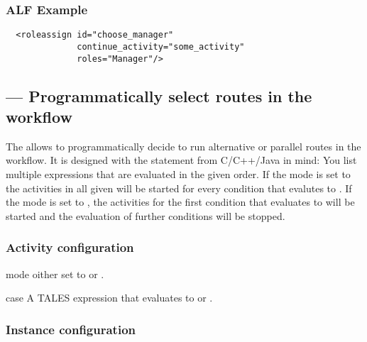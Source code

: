 \subsubsection{ALF Example}

\begin{verbatim}
  <roleassign id="choose_manager"
              continue_activity="some_activity"
              roles="Manager"/>
\end{verbatim}

\subsection{ --- Programmatically select routes in the workflow}

 
The  allows to programmatically decide to run alternative or
parallel routes in the workflow.  It is designed with the 
statement from C/C++/Java in mind: You list multiple expressions that are
evaluated in the given order. If the mode is set to  the activities in
all given will be started for every condition that evalutes to .  If
the mode is set to , the activities for the first condition that
evaluates to  will be started and the evaluation of further
conditions will be stopped.
 
\subsubsection{Activity configuration}

\begin{memberdesc}{mode}
    oither set to  or . 
\end{memberdesc}
\begin{memberdesc}{case}
    A TALES expression that evaluates to  or .

\end{memberdesc}

\subsubsection{Instance configuration}
 
